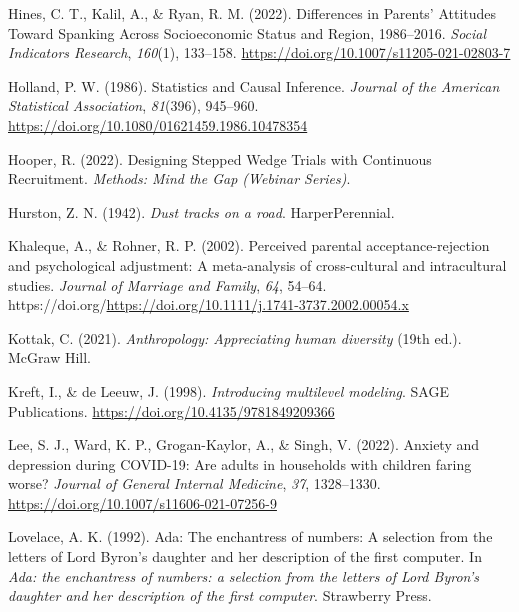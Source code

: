 \documentclass[
  letterpaper,
  DIV=11,
  numbers=noendperiod]{scrreprt}
\newlength{\cslhangindent}
\newlength{\cslentryspacingunit} %
\newenvironment{CSLReferences}[2] %
 {%
  \setlength{\parindent}{0pt}
  \ifodd #1
  \let\oldpar\par
  \def\par{\hangindent=\cslhangindent\oldpar}
  \fi
  \setlength{\parskip}{#2\cslentryspacingunit}
 }%
 {}
\begin{document}
\begin{CSLReferences}{1}{0}
\leavevmode{}%
Hines, C. T., Kalil, A., \& Ryan, R. M. (2022). {Differences in Parents'
Attitudes Toward Spanking Across Socioeconomic Status and Region,
1986--2016}. \emph{Social Indicators Research}, \emph{160}(1), 133--158.
\url{https://doi.org/10.1007/s11205-021-02803-7}

\leavevmode{}%
Holland, P. W. (1986). {Statistics and Causal Inference}. \emph{Journal
of the American Statistical Association}, \emph{81}(396), 945--960.
\url{https://doi.org/10.1080/01621459.1986.10478354}

\leavevmode{}%
Hooper, R. (2022). {Designing Stepped Wedge Trials with Continuous
Recruitment}. \emph{Methods: Mind the Gap (Webinar Series)}.

\leavevmode{}%
Hurston, Z. N. (1942). \emph{Dust tracks on a road}. HarperPerennial.

\leavevmode{}%
Khaleque, A., \& Rohner, R. P. (2002). Perceived parental
acceptance-rejection and psychological adjustment: A meta-analysis of
cross-cultural and intracultural studies. \emph{Journal of Marriage and
Family}, \emph{64}, 54--64.
https://doi.org/\url{https://doi.org/10.1111/j.1741-3737.2002.00054.x}

\leavevmode{}%
Kottak, C. (2021). \emph{Anthropology: Appreciating human diversity}
(19th ed.). McGraw Hill.

\leavevmode{}%
Kreft, I., \& de Leeuw, J. (1998). \emph{Introducing multilevel
modeling}. SAGE Publications.
\url{https://doi.org/10.4135/9781849209366}

\leavevmode{}%
Lee, S. J., Ward, K. P., Grogan-Kaylor, A., \& Singh, V. (2022). Anxiety
and depression during {COVID-19}: Are adults in households with children
faring worse? \emph{Journal of General Internal Medicine}, \emph{37},
1328--1330. \url{https://doi.org/10.1007/s11606-021-07256-9}

\leavevmode{}%
Lovelace, A. K. (1992). Ada: The enchantress of numbers: A selection
from the letters of {L}ord {B}yron's daughter and her description of the
first computer. In \emph{Ada: the enchantress of numbers: a selection
from the letters of {L}ord {B}yron's daughter and her description of the
first computer}. Strawberry Press.


\end{CSLReferences}
\end{document}
